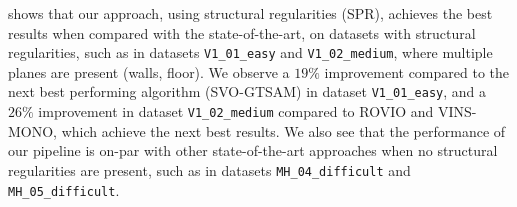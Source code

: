  shows that our approach, using structural regularities (SPR), achieves the best results when compared with the state-of-the-art,
 on datasets with structural regularities, such as in datasets \texttt{V1\_01\_easy} and \texttt{V1\_02\_medium},
  where multiple planes are present (walls, floor).
    We observe a $19\%$ improvement compared to the next best performing algorithm (SVO-GTSAM) in dataset \texttt{V1\_01\_easy},
     and a $26\%$ improvement in dataset \texttt{V1\_02\_medium} compared to ROVIO and VINS-MONO, which achieve the next best results.
    We also see that the performance of our pipeline is on-par with other state-of-the-art approaches when no structural regularities are present, such as in datasets \texttt{MH\_04\_difficult} and \texttt{MH\_05\_difficult}.







